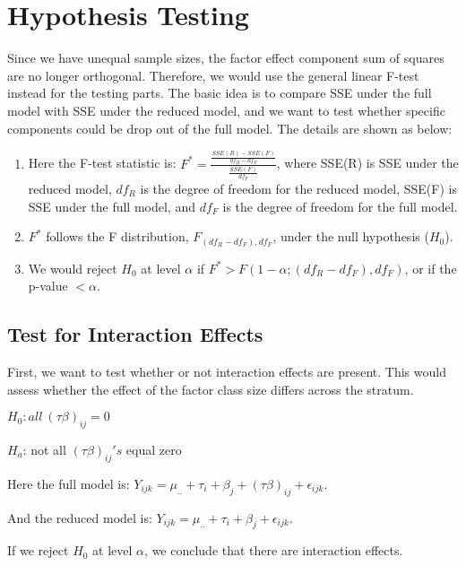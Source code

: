\documentclass[]{article}
\title{}
\author{}
\date{}
\begin{document}
\hypertarget{hypothesis-testing}{%
\section{Hypothesis Testing}\label{hypothesis-testing}}

Since we have unequal sample sizes, the factor effect component sum of squares are no longer orthogonal. Therefore, we would use the general linear F-test instead for the testing parts. The basic idea is to compare SSE under the full model with SSE under the reduced model, and we want to test whether specific components could be drop out of the full model. The details are shown as below:

\begin{enumerate}
\def\labelenumi{(\arabic{enumi})}
\item
  Here the F-test statistic is: \(F^* = \frac{\frac{SSE(R)-SSE(F)}{df_R-df_F}}{\frac{SSE(F)}{df_F}}\), where SSE(R) is SSE under the reduced model, \(df_R\) is the degree of freedom for the reduced model, SSE(F) is SSE under the full model, and \(df_F\) is the degree of freedom for the full model.
\item
  \(F^*\) follows the F distribution, \(F_{(df_R-df_F),df_F}\), under the null hypothesis (\(H_0\)).
\item
  We would reject \(H_0\) at level \(\alpha\) if \(F^* > F(1-\alpha;(df_R-df_F),df_F)\), or if the p-value \(< \alpha\).
\end{enumerate}

\hypertarget{test-for-interaction-effects}{%
\subsection{Test for Interaction Effects}\label{test-for-interaction-effects}}

First, we want to test whether or not interaction effects are present. This would assess whether the effect of the factor class size differs across the stratum.

\(H_0: all \ (\tau\beta)_{ij} = 0\)

\(H_a\): not all \((\tau\beta)_{ij}'s\) equal zero

Here the full model is: \(Y_{ijk} = \mu_{..} + \tau_i + \beta_j + (\tau\beta)_{ij} + \epsilon_{ijk}\).

And the reduced model is: \(Y_{ijk} = \mu_{..} + \tau_i + \beta_j + \epsilon_{ijk}\).

If we reject \(H_0\) at level \(\alpha\), we conclude that there are interaction effects.
\end{document}
